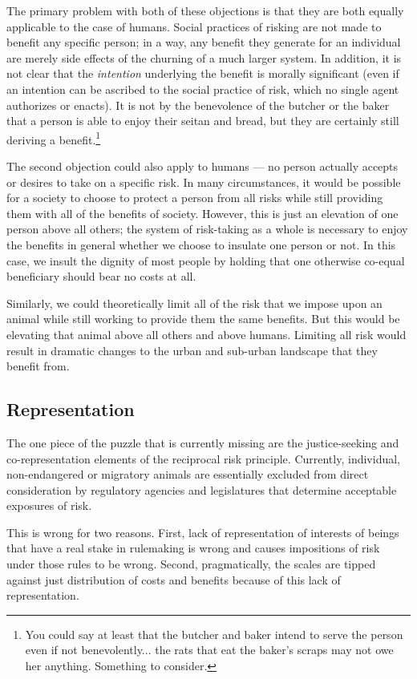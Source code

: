 The primary problem with both of these objections is that they are both equally
applicable to the case of humans. Social practices of risking are not made to
benefit any specific person; in a way, any benefit they generate for an
individual are merely side effects of the churning of a much larger system. In
addition, it is not clear that the \emph{intention} underlying the benefit is
morally significant (even if an intention can be ascribed to the social
practice of risk, which no single agent authorizes or enacts). It is not by the
benevolence of the butcher or the baker that a person is able to enjoy their
seitan and bread, but they are certainly still deriving a benefit.\footnote{You
could say at least that the butcher and baker intend to serve the person even
if not benevolently... the rats that eat the baker’s scraps may not owe her
anything. Something to consider.}

The second objection could also apply to humans --- no person actually accepts
or desires to take on a specific risk. In many circumstances, it would be
possible for a society to choose to protect a person from all risks while still
providing them with all of the benefits of society. However, this is just an
elevation of one person above all others; the system of risk-taking as a whole
is necessary to enjoy the benefits in general whether we choose to insulate one
person or not. In this case, we insult the dignity of most people by holding
that one otherwise co-equal beneficiary should bear no costs at all.

Similarly, we could theoretically limit all of the risk that we impose upon an
animal while still working to provide them the same benefits. But this would be
elevating that animal above all others and above humans. Limiting all risk
would result in dramatic changes to the urban and sub-urban landscape that they
benefit from.

\subsection{Representation}

The one piece of the puzzle that is currently missing are the justice-seeking
and co-representation elements of the reciprocal risk principle. Currently,
individual, non-endangered or migratory animals are essentially excluded from
direct consideration by regulatory agencies and legislatures that determine
acceptable exposures of risk.

This is wrong for two reasons. First, lack of representation of interests of
beings that have a real stake in rulemaking is wrong and causes impositions of
risk under those rules to be wrong. Second, pragmatically, the scales are
tipped against just distribution of costs and benefits because of this lack of
representation.


